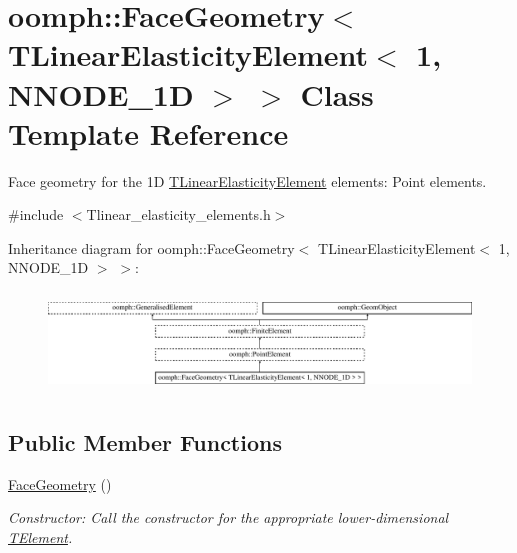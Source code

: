 \hypertarget{classoomph_1_1FaceGeometry_3_01TLinearElasticityElement_3_011_00_01NNODE__1D_01_4_01_4}{}\section{oomph\+:\+:Face\+Geometry$<$ T\+Linear\+Elasticity\+Element$<$ 1, N\+N\+O\+D\+E\+\_\+1D $>$ $>$ Class Template Reference}
\label{classoomph_1_1FaceGeometry_3_01TLinearElasticityElement_3_011_00_01NNODE__1D_01_4_01_4}


Face geometry for the 1D \hyperlink{classoomph_1_1TLinearElasticityElement}{T\+Linear\+Elasticity\+Element} elements\+: Point elements.  




{\ttfamily \#include $<$Tlinear\+\_\+elasticity\+\_\+elements.\+h$>$}

Inheritance diagram for oomph\+:\+:Face\+Geometry$<$ T\+Linear\+Elasticity\+Element$<$ 1, N\+N\+O\+D\+E\+\_\+1D $>$ $>$\+:\begin{figure}[H]
\begin{center}
\leavevmode
\includegraphics[height=2.698795cm]{classoomph_1_1FaceGeometry_3_01TLinearElasticityElement_3_011_00_01NNODE__1D_01_4_01_4}
\end{center}
\end{figure}
\subsection*{Public Member Functions}
\begin{DoxyCompactItemize}
\item 
\hyperlink{classoomph_1_1FaceGeometry_3_01TLinearElasticityElement_3_011_00_01NNODE__1D_01_4_01_4_abe0f31deb78ec0f40049b7ec68180441}{Face\+Geometry} ()
\begin{DoxyCompactList}\small\item\em Constructor\+: Call the constructor for the appropriate lower-\/dimensional \hyperlink{classoomph_1_1TElement}{T\+Element}. \end{DoxyCompactList}\end{DoxyCompactItemize}
